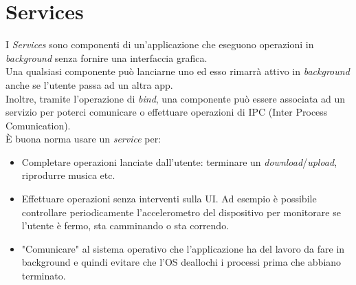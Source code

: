 \chapter{Services}

I \textit{Services} sono componenti di un'applicazione che eseguono operazioni in \textit{background} senza fornire una interfaccia grafica. \\
Una qualsiasi componente può lanciarne uno ed esso rimarrà attivo in \textit{background} anche se l'utente passa ad un altra app.\\
Inoltre, tramite l'operazione di \textit{bind}, una componente può essere associata ad un servizio per poterci comunicare o effettuare operazioni di IPC (Inter Process Comunication).\\
È buona norma usare un \textit{service} per:
\begin{itemize}
	\item Completare operazioni lanciate dall'utente: terminare un \textit{download}/\textit{upload}, riprodurre musica etc.
	\item Effettuare operazioni senza interventi sulla UI. Ad esempio è possibile controllare periodicamente l'accelerometro del dispositivo per monitorare se l'utente è fermo, sta camminando o sta correndo.
	\item "Comunicare" al sistema operativo che l'applicazione ha del lavoro da fare in background e quindi evitare che l'OS deallochi i processi prima che abbiano terminato.
\end{itemize}

